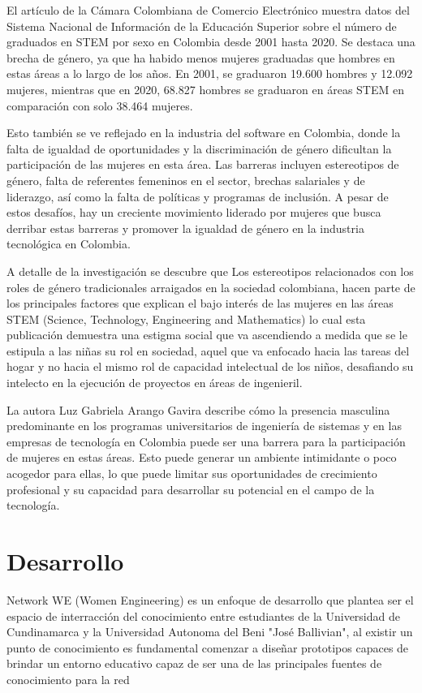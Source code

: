 \documentclass[hidelinks]{Documento}
\begin{document}
El artículo de la Cámara Colombiana de Comercio Electrónico muestra datos del Sistema Nacional de Información de la Educación Superior sobre el número de graduados en STEM por sexo en Colombia desde 2001 hasta 2020. Se destaca una brecha de género, ya que ha habido menos mujeres graduadas que hombres en estas áreas a lo largo de los años. En 2001, se graduaron 19.600 hombres y 12.092 mujeres, mientras que en 2020, 68.827 hombres se graduaron en áreas STEM en comparación con solo 38.464 mujeres.

Esto también se ve reflejado en la industria del software en Colombia, donde la falta de igualdad de oportunidades y la discriminación de género dificultan la participación de las mujeres en esta área. Las barreras incluyen estereotipos de género, falta de referentes femeninos en el sector, brechas salariales y de liderazgo, así como la falta de políticas y programas de inclusión. A pesar de estos desafíos, hay un creciente movimiento liderado por mujeres que busca derribar estas barreras y promover la igualdad de género en la industria tecnológica en Colombia.


A detalle de la investigación se descubre que Los estereotipos relacionados con los roles de género tradicionales arraigados en la sociedad colombiana, hacen parte de los principales factores que explican el bajo interés de las mujeres en las áreas STEM (Science, Technology, Engineering and Mathematics)  lo cual esta publicación demuestra una estigma social que va ascendiendo a medida que se le estipula a las niñas su rol en sociedad, aquel que va enfocado hacia las tareas del hogar y no hacia el mismo rol de capacidad intelectual de los niños, desafiando su intelecto en la ejecución de proyectos en áreas de ingenieril. 

La autora Luz Gabriela Arango Gavira  describe cómo la presencia masculina predominante en los programas universitarios de ingeniería de sistemas y en las empresas de tecnología en Colombia puede ser una barrera para la participación de mujeres en estas áreas. Esto puede generar un ambiente intimidante o poco acogedor para ellas, lo que puede limitar sus oportunidades de crecimiento profesional y su capacidad para desarrollar su potencial en el campo de la tecnología. 


\chapter{Desarrollo}


Network WE (Women Engineering) es un enfoque de desarrollo que plantea ser el espacio de interracción del conocimiento entre estudiantes de la Universidad de Cundinamarca y la Universidad Autonoma del Beni "José Ballivian", al existir un punto de conocimiento es fundamental comenzar a diseñar prototipos capaces de brindar un entorno educativo capaz de ser una de las principales fuentes de conocimiento para la red \cite{Latorre-Cosculluela2020}
\end{document}
